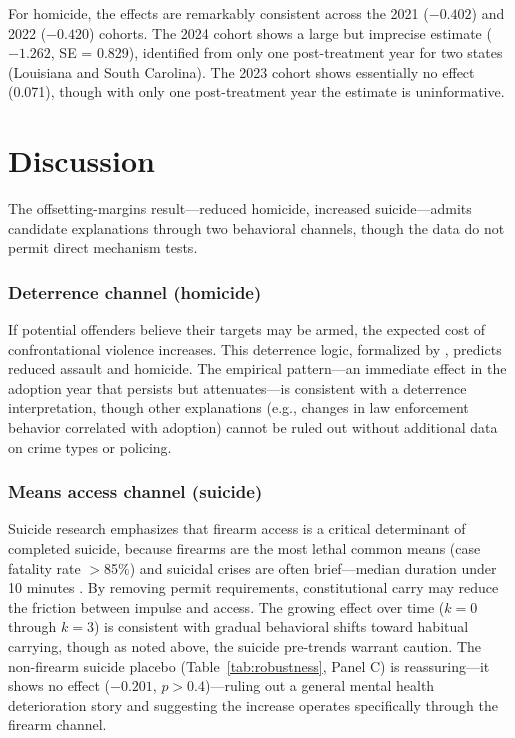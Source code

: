 \documentclass[12pt]{article}
\begin{document}
For homicide, the effects are remarkably consistent across the 2021 ($-0.402$) and 2022 ($-0.420$) cohorts. The 2024 cohort shows a large but imprecise estimate ($-1.262$, SE = 0.829), identified from only one post-treatment year for two states (Louisiana and South Carolina). The 2023 cohort shows essentially no effect (0.071), though with only one post-treatment year the estimate is uninformative.

\section{Discussion}
\label{sec:discussion}

The offsetting-margins result---reduced homicide, increased suicide---admits candidate explanations through two behavioral channels, though the data do not permit direct mechanism tests.

\subsubsection*{Deterrence channel (homicide)} If potential offenders believe their targets may be armed, the expected cost of confrontational violence increases. This deterrence logic, formalized by \citet{lottmustard1997}, predicts reduced assault and homicide. The empirical pattern---an immediate effect in the adoption year that persists but attenuates---is consistent with a deterrence interpretation, though other explanations (e.g., changes in law enforcement behavior correlated with adoption) cannot be ruled out without additional data on crime types or policing.

\subsubsection*{Means access channel (suicide)} Suicide research emphasizes that firearm access is a critical determinant of completed suicide, because firearms are the most lethal common means (case fatality rate $>$85\%) and suicidal crises are often brief---median duration under 10 minutes \citep{miller2007, edwards2024}. By removing permit requirements, constitutional carry may reduce the friction between impulse and access. The growing effect over time ($k = 0$ through $k = 3$) is consistent with gradual behavioral shifts toward habitual carrying, though as noted above, the suicide pre-trends warrant caution. The non-firearm suicide placebo (Table~\ref{tab:robustness}, Panel C) is reassuring---it shows no effect ($-0.201$, $p > 0.4$)---ruling out a general mental health deterioration story and suggesting the increase operates specifically through the firearm channel.
\end{document}
